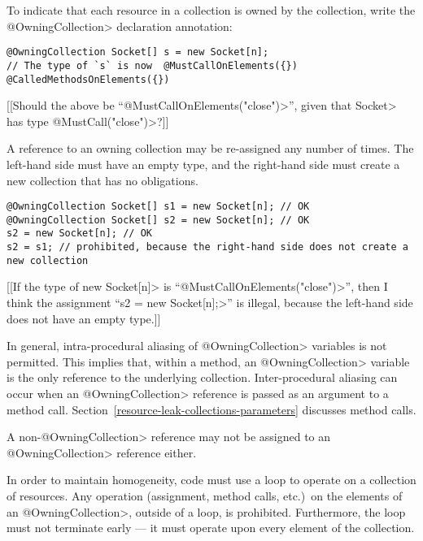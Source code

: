 
To indicate that each resource in a collection is owned by the collection, write the \<@OwningCollection> declaration annotation:

\begin{Verbatim}
@OwningCollection Socket[] s = new Socket[n];
// The type of `s` is now  @MustCallOnElements({}) @CalledMethodsOnElements({})
\end{Verbatim}

[[Should the above be ``\<@MustCallOnElements("close")>'', given that \<Socket>
has type \<@MustCall("close")>?]]

A reference to an owning collection may be re-assigned any number of times.
The left-hand side must have an empty \MustCallOnElements type, and the
right-hand side must create a new collection that has no
\MustCallOnElements obligations.

\begin{verbatim}
@OwningCollection Socket[] s1 = new Socket[n]; // OK
@OwningCollection Socket[] s2 = new Socket[n]; // OK
s2 = new Socket[n]; // OK
s2 = s1; // prohibited, because the right-hand side does not create a new collection
\end{verbatim}

[[If the type of \<new Socket[n]> is ``\<@MustCallOnElements("close")>'', then I
think the assignment ``\<s2 = new Socket[n];>'' is illegal, because the
left-hand side does not have an empty \MustCallOnElements type.]]

In general, intra-procedural aliasing of \<@OwningCollection> variables is not
permitted.  This implies that, within a method, an \<@OwningCollection> variable is the
only reference to the underlying collection.  Inter-procedural aliasing can
occur when an \<@OwningCollection> reference is passed as an argument to a
method call.  Section~\ref{resource-leak-collections-parameters} discusses
method calls.

A non-\<@OwningCollection> reference may not be assigned to an \<@OwningCollection> reference either.



In order to maintain homogeneity, code must use a loop to operate on a
collection of resources.  Any operation (assignment, method calls, etc.)\
on the elements of an \<@OwningCollection>, outside of a loop, is
prohibited.  Furthermore, the loop must not terminate early --- it must
operate upon every element of the collection.

